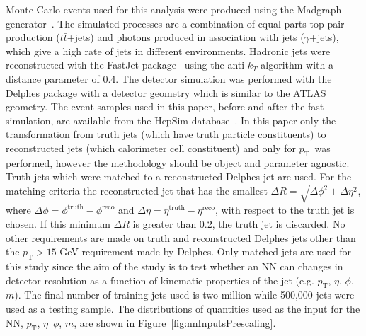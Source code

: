 \documentclass[showpacs,showkeys,preprint,prd,nofootinbib,linenumbers,12pt,superscriptaddress]{revtex4-1}
\def\pt{\ensuremath{p_{\mathrm{T}}}}
\begin{document}
Monte Carlo events used for this analysis were produced using the Madgraph generator~\cite{Alwall:2014hca}. The simulated processes are a combination of equal parts top pair production ($t\bar{t}$+jets) and photons produced in association with jets ($\gamma$+jets), which give a high rate of jets in different environments. 
Hadronic jets were reconstructed with the {\sc FastJet} package~\cite{Fastjet} using the anti-$k_T$ algorithm \cite{Cacciari:2008gp} with a distance parameter of 0.4. The detector simulation was performed with the Delphes package with a detector geometry which is similar to the ATLAS geometry. 
The event samples used in this paper, before and after the fast simulation, are available from the HepSim database~\cite{Chekanov:2014fga}. In this paper only the transformation from truth jets (which have truth particle constituents) to reconstructed jets (which calorimeter cell constituent) and only for \pt\ was performed, however the methodology should be object and parameter agnostic. Truth jets which were matched to a reconstructed Delphes jet are used. For the matching criteria the reconstructed jet that has the smallest $\Delta R=\sqrt{\Delta\phi^2+\Delta\eta^2}$, where $\Delta\phi=\phi^{\text{truth}}-\phi^{\text{reco}}$ and $\Delta\eta=\eta^{\text{truth}}-\eta^{\text{reco}}$, with respect to the truth jet is chosen. If this minimum $\Delta R$ is greater than 0.2, the truth jet is discarded. No other requirements are made on truth and reconstructed Delphes jets other than the $\pt>15$ GeV requirement made by Delphes. Only matched jets are used for this study since the aim of the study is to test whether an NN can changes in detector resolution as a function of kinematic properties of the jet (e.g. $\pt$, $\eta$, $\phi$, $m$). 
The final number of training jets used is two million while 500,000 jets were used as a testing sample. The distributions of quantities used as the input for the NN, \pt, $\eta$\, $\phi$, $m$, are shown in Figure~\ref{fig:nnInputsPrescaling}.
\end{document}
